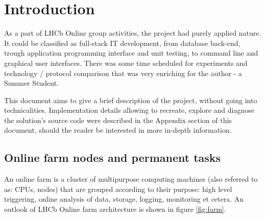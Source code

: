 \documentclass{customization}
\begin{document}
\tabledematieres  %




\section{Introduction} 
\hspace{0.6cm}

As a part of LHCb Online group activities, the project had purely applied nature. It could be classified as full-stack IT development, from database back-end, trough application programming interface and unit testing, to command line and graphical user interfaces. There was some time scheduled for experiments and technology / protocol comparison that was very enriching for the author - a Summer Student.
\newline

\noindent
This document aims to give a brief description of the project, without going into technicalities. Implementation details allowing to recreate, explore and diagnose the solution's source code were described in the Appendix section of this document, should the reader be interested in more in-depth information.

\subsection{Online farm nodes and permanent tasks}
\hspace{0.6cm}

An online farm is a cluster of multipurpose computing machines (also referred to as: CPUs, nodes) that are grouped according to their purpose: high level triggering, online analysis of data, storage, logging, monitoring et cetera. An outlook of LHCb Online farm architecture is shown in figure \ref{fig:farm}.
\end{document}
